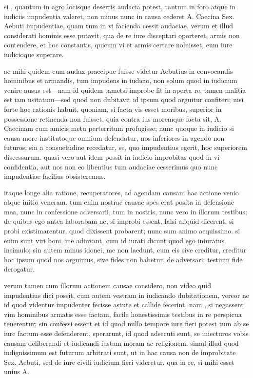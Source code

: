 
 si , quantum in agro locisque desertis audacia potest, tantum in foro atque in iudiciis impudentia valeret, non minus nunc in causa cederet A. Caecina Sex. Aebuti impudentiae, quam tum in vi facienda cessit audaciae. verum et illud considerati hominis esse putavit, qua de re iure disceptari oporteret, armis non contendere, et hoc constantis, quicum vi et armis certare noluisset, eum iure iudicioque superare.

 ac mihi quidem cum audax praecipue fuisse videtur Aebutius in convocandis hominibus et armandis, tum impudens in iudicio, non solum quod in iudicium venire ausus est—nam id quidem tametsi improbe fit in aperta re, tamen malitia est iam usitatum—sed quod non dubitavit id ipsum quod arguitur confiteri; nisi forte hoc rationis habuit, quoniam, si facta vis esset moribus, superior in possessione retinenda non fuisset, quia contra ius moremque facta sit, A. Caecinam cum amicis metu perterritum profugisse; nunc quoque in iudicio si causa more institutoque omnium defendatur, nos inferiores in agendo non futuros; sin a consuetudine recedatur, se, quo impudentius egerit, hoc superiorem discessurum. quasi vero aut idem possit in iudicio improbitas quod in vi confidentia, aut nos non eo libentius tum audaciae cesserimus quo nunc impudentiae facilius obsisteremus.

 itaque longe alia ratione, recuperatores, ad agendam causam hac actione venio atque initio veneram. tum enim nostrae causae spes erat posita in defensione mea, nunc in confessione adversarii, tum in nostris, nunc vero in illorum testibus; de quibus ego antea laborabam ne, si improbi essent, falsi aliquid dicerent, si probi existimarentur, quod dixissent probarent; nunc sum animo aequissimo. si enim sunt viri boni, me adiuvant, cum id iurati dicunt quod ego iniuratus insimulo; sin autem minus idonei, me non laedunt, cum eis sive creditur, creditur hoc ipsum quod nos arguimus, sive fides non habetur, de adversarii testium fide derogatur.

 verum tamen cum illorum actionem causae considero, non video quid impudentius dici possit, cum autem vestram in iudicando dubitationem, vereor ne id quod videntur impudenter fecisse astute et callide fecerint. nam , si negassent vim hominibus armatis esse factam, facile honestissimis testibus in re perspicua tenerentur; sin confessi essent et id quod nullo tempore iure fieri potest tum ab se iure factum esse defenderent, sperarunt, id quod adsecuti sunt, se iniecturos vobis causam deliberandi et iudicandi iustam moram ac religionem. simul illud quod indignissimum est futurum arbitrati sunt, ut in hac causa non de improbitate Sex. Aebuti, sed de iure civili iudicium fieri videretur. qua in re, si mihi esset unius A.

